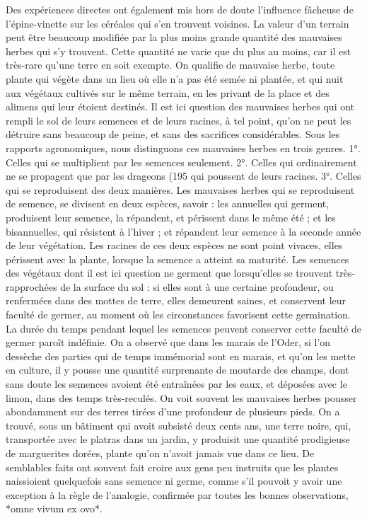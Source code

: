 Des expériences directes ont également mis hors de doute l'influence fâcheuse de l'épine-vinette sur les céréales qui s'en trouvent voisines.
La valeur d'un terrain peut être beaucoup modifiée par la plus moins grande quantité des mauvaises herbes qui s'y trouvent. Cette quantité ne varie que du plus au moins, car il est très-rare qu'une terre en soit exempte.
On qualifie de mauvaise herbe, toute plante qui végète dans un lieu où elle n'a pas été semée ni plantée, et qui nuit aux végétaux cultivés sur le même terrain, en les privant de la place et des alimens qui leur étoient destinés. Il est ici question des mauvaises herbes qui ont rempli le sol de leurs semences et de leurs racines, à tel point, qu'on ne peut les détruire sans beaucoup de peine, et sans des sacrifices considérables.
Sous les rapports agronomiques, nous distinguons ces mauvaises herbes en trois genres. 1°. Celles qui se multiplient par les semences seulement. 2°. Celles qui ordinairement ne se propagent que par les drageons\setcounter{page}{195} (195 qui poussent de leurs racines. 3°. Celles qui se reproduisent des deux manières.
Les mauvaises herbes qui se reproduisent de semence, se divisent en deux espèces, savoir : les annuelles qui germent, produisent leur semence, la répandent, et périssent dans le même été ; et les bisannuelles, qui résistent à l'hiver ; et répandent leur semence à la seconde année de leur végétation. Les racines de ces deux espèces ne sont point vivaces, elles périssent avec la plante, lorsque la semence a atteint sa maturité.
Les semences des végétaux dont il est ici question ne germent que lorsqu'elles se trouvent très-rapprochées de la surface du sol : si elles sont à une certaine profondeur, ou renfermées dans des mottes de terre, elles demeurent saines, et conservent leur faculté de germer, au moment où les circonstances favorisent cette germination. La durée du temps pendant lequel les semences peuvent conserver cette faculté de germer paroît indéfinie. On a observé que dans les marais de l'Oder, si l'on dessèche des parties qui de temps immémorial sont en marais, et qu'on les mette en culture, il y pousse une quantité surprenante de moutarde des champs, dont sans doute les semences avoient été entraînées par les eaux, et déposées avec le\setcounter{page}{196} limon, dans des temps très-reculés. On voit souvent les mauvaises herbes pousser abondamment sur des terres tirées d'une profondeur de plusieurs pieds. On a trouvé, sous un bâtiment qui avoit subsisté deux cents ans, une terre noire, qui, transportée avec le platras dans un jardin, y produisit une quantité prodigieuse de marguerites dorées, plante qu'on n'avoit jamais vue dans ce lieu. De semblables faits ont souvent fait croire aux gens peu instruits que les plantes naissioient quelquefois sans semence ni germe, comme s'il pouvoit y avoir une exception à la règle de l'analogie, confirmée par toutes les bonnes observations, *omne vivum ex ovo*.
